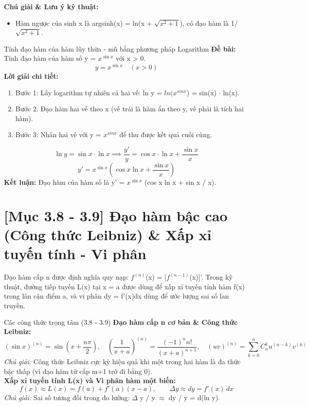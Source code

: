 \documentclass[11pt,a4paper,oneside]{book}
\begin{document}
\noindent\textbf{Chú giải \& Lưu ý kỹ thuật:}
\begin{itemize}[leftmargin=1.5em, itemsep=2pt]
  \item Hàm ngược của sinh x là argsinh(x) = ln(x + $\sqrt{x^2 + 1}$), có đạo hàm là 1/$\sqrt{x^2 + 1}$.
\end{itemize}

\begin{vidu}{Tính đạo hàm của hàm lũy thừa - mũ bằng phương pháp Logarithm}
\textbf{Đề bài:} Tính đạo hàm của hàm số y = $x^{\sin x}$ với x > 0.
\[ y = x^{\sin x} \quad (x > 0) \]
\textbf{Lời giải chi tiết:}
\begin{enumerate}[leftmargin=1.5em, itemsep=2pt]
  \item Bước 1: Lấy logarithm tự nhiên cả hai vế: ln y = $ln(x^{sin x}$) = sin(x) $\cdot$  ln(x).
  \item Bước 2: Đạo hàm hai vế theo x (vế trái là hàm ẩn theo y, vế phải là tích hai hàm).
  \item Bước 3: Nhân hai vế với y = $x^{sin x}$ để thu được kết quả cuối cùng.
\end{enumerate}
\[ \ln y = \sin x \cdot \ln x \implies \frac{y'}{y} = \cos x \cdot \ln x + \frac{\sin x}{x} \]
\[ y' = x^{\sin x} \left( \cos x \ln x + \frac{\sin x}{x} \right) \]
\noindent\textbf{Kết luận:} Đạo hàm của hàm số là y' = $x^{\sin x}$ (cos x ln x + sin x / x).
\end{vidu}

\section{[Mục 3.8 - 3.9] Đạo hàm bậc cao (Công thức Leibniz) \& Xấp xỉ tuyến tính - Vi phân}
Đạo hàm cấp n được định nghĩa quy nạp: $f^{(n)}$(x) = $[f^{(n-1)}$(x)]'. Trong kỹ thuật, đường tiếp tuyến L(x) tại x = a được dùng để xấp xỉ tuyến tính hàm f(x) trong lân cận điểm a, và vi phân dy = f'(x)dx dùng để ước lượng sai số lan truyền.

\begin{congthuc}{Các công thức trọng tâm (3.8 - 3.9)}
\noindent\textbf{Đạo hàm cấp n cơ bản \& Công thức Leibniz:}
\[ (\sin x)^{(n)} = \sin\left(x + \frac{n\pi}{2}\right), \quad \left(\frac{1}{x+a}\right)^{(n)} = \frac{(-1)^n n!}{(x+a)^{n+1}}, \quad (uv)^{(n)} = \sum_{k=0}^n C_n^k u^{(n-k)} v^{(k)} \]
\noindent\textit{Chú giải:} Công thức Leibniz cực kỳ hiệu quả khi một trong hai hàm là đa thức bậc thấp (vì đạo hàm từ cấp m+1 trở đi bằng 0).\\[4pt]
\noindent\textbf{Xấp xỉ tuyến tính L(x) và Vi phân hàm một biến:}
\[ f(x) \approx L(x) = f(a) + f'(a)(x - a), \qquad \Delta y \approx dy = f'(x)\,dx \]
\noindent\textit{Chú giải:} Sai số tương đối trong đo lường: $\Delta$ y / y $\approx$  dy / y = d(ln y).\\[4pt]
\end{congthuc}
\end{document}
